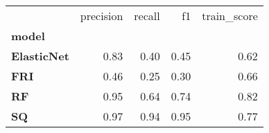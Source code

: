 \begin{tabular}{lrrrr}
\toprule
{} &  precision &  recall &   f1 &  train\_score \\
\textbf{model     } &            &         &      &              \\
\midrule
\textbf{ElasticNet} &       0.83 &    0.40 & 0.45 &         0.62 \\
\textbf{FRI       } &       0.46 &    0.25 & 0.30 &         0.66 \\
\textbf{RF        } &       0.95 &    0.64 & 0.74 &         0.82 \\
\textbf{SQ        } &       0.97 &    0.94 & 0.95 &         0.77 \\
\bottomrule
\end{tabular}
